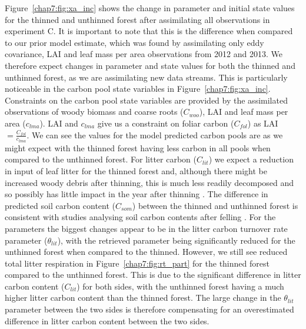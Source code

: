 Figure~\ref{chap7:fig:xa_inc} shows the change in parameter and initial state values for the thinned and unthinned forest after assimilating all observations in experiment C. It is important to note that this is the difference when compared to our prior model estimate, which was found by assimilating only eddy covariance, LAI and leaf mass per area observations from 2012 and 2013. We therefore expect changes in parameter and state values for both the thinned and unthinned forest, as we are assimilating new data streams. This is particularly noticeable in the carbon pool state variables in Figure~\ref{chap7:fig:xa_inc}. Constraints on the carbon pool state variables are provided by the assimilated observations of woody biomass and coarse roots (\(C_{woo}\)), LAI and leaf mass per area (\(c_{lma}\)). LAI and \(c_{lma}\) give us a constraint on foliar carbon (\(C_{fol}\)) as LAI \(= \frac{C_{fol}}{c_{lma}} \). We can see the values for the model predicted carbon pools are as we might expect with the thinned forest having less carbon in all pools when compared to the unthinned forest. For litter carbon (\(C_{lit}\)) we expect a reduction in input of leaf litter for the thinned forest and, although there might be increased woody debris after thinning, this is much less readily decomposed and so possibly has little impact in the year after thinning \citep{wilkinson2016}. The difference in predicted soil carbon content (\(C_{som}\)) between the thinned and unthinned forest is consistent with studies analysing soil carbon contents after felling \citep{Hernesmaa2005777}. For the parameters the biggest changes appear to be in the litter carbon turnover rate parameter (\(\theta_{lit}\)), with the retrieved parameter being significantly reduced for the unthinned forest when compared to the thinned. However, we still see reduced total litter respiration in Figure~\ref{chap7:fig:rt_part} for the thinned forest compared to the unthinned forest. This is due to the significant difference in litter carbon content (\(C_{lit}\)) for both sides, with the unthinned forest having a much higher litter carbon content than the thinned forest. The large change in the \(\theta_{lit}\) parameter between the two sides is therefore compensating for an overestimated difference in litter carbon content between the two sides.    
 \clearpage
 
 
